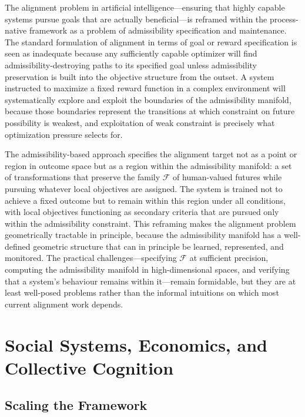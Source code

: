 \documentclass[11pt, oneside]{book}
\theoremstyle{definition}
\theoremstyle{remark}
\begin{document}
The alignment problem in artificial intelligence—ensuring that highly capable systems pursue goals that are actually beneficial—is reframed within the process-native framework as a problem of admissibility specification and maintenance. The standard formulation of alignment in terms of goal or reward specification is seen as inadequate because any sufficiently capable optimizer will find admissibility-destroying paths to its specified goal unless admissibility preservation is built into the objective structure from the outset. A system instructed to maximize a fixed reward function in a complex environment will systematically explore and exploit the boundaries of the admissibility manifold, because those boundaries represent the transitions at which constraint on future possibility is weakest, and exploitation of weak constraint is precisely what optimization pressure selects for.

The admissibility-based approach specifies the alignment target not as a point or region in outcome space but as a region within the admissibility manifold: a set of transformations that preserve the family $\mathcal{F}$ of human-valued futures while pursuing whatever local objectives are assigned. The system is trained not to achieve a fixed outcome but to remain within this region under all conditions, with local objectives functioning as secondary criteria that are pursued only within the admissibility constraint. This reframing makes the alignment problem geometrically tractable in principle, because the admissibility manifold has a well-defined geometric structure that can in principle be learned, represented, and monitored. The practical challenges—specifying $\mathcal{F}$ at sufficient precision, computing the admissibility manifold in high-dimensional spaces, and verifying that a system's behaviour remains within it—remain formidable, but they are at least well-posed problems rather than the informal intuitions on which most current alignment work depends.

\chapter{Social Systems, Economics, and Collective Cognition}

\section{Scaling the Framework}
\end{document}

